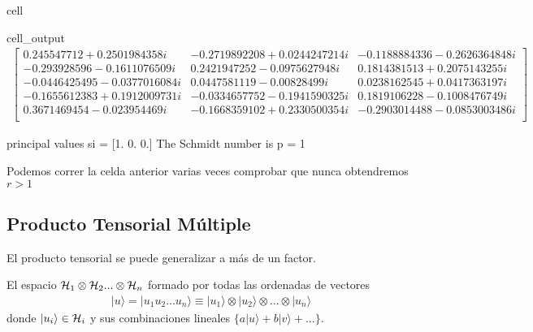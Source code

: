 \documentclass[letterpaper,10pt,english]{jupyterBook}
\newcommand{\ket}[1]{|#1\rangle}
\newcommand{\Hil}{{\cal H}}
\begin{document}
\begin{sphinxuseclass}{cell}
\begin{sphinxVerbatimOutput}
\begin{sphinxuseclass}{cell_output}\begin{equation*}
\begin{split}\begin{bmatrix}
0.245547712 + 0.2501984358 i & -0.2719892208 + 0.0244247214 i & -0.1188884336 - 0.2626364848 i  \\
 -0.293928596 - 0.1611076509 i & 0.2421947252 - 0.0975627948 i & 0.1814381513 + 0.2075143255 i  \\
 -0.0446425495 - 0.0377016084 i & 0.0447581119 - 0.00828499 i & 0.0238162545 + 0.0417363197 i  \\
 -0.1655612383 + 0.1912009731 i & -0.0334657752 - 0.1941590325 i & 0.1819106228 - 0.1008476749 i  \\
 0.3671469454 - 0.023954469 i & -0.1668359102 + 0.2330500354 i & -0.2903014488 - 0.0853003486 i  \\
 \end{bmatrix}
\end{split}
\end{equation*}
\begin{sphinxVerbatim}[commandchars=\\\{\}]
principal values s\PYGZus{}i =  [1. 0. 0.]
The Schmidt number is p = 1
\end{sphinxVerbatim}

\end{sphinxuseclass}\end{sphinxVerbatimOutput}

\end{sphinxuseclass}
\sphinxAtStartPar
Podemos correr la celda anterior varias veces comprobar que nunca obtendremos \(r>1\)


\subsection{Producto Tensorial Múltiple}
\label{\detokenize{docs/Part_01_Formalismo/Chapter_01_02_Formalismo_matem_xe1tico/01_04_Tensores_myst:producto-tensorial-multiple}}
\sphinxAtStartPar
El producto tensorial se puede generalizar a más de un factor.

\sphinxAtStartPar
El espacio \( \Hil_1\otimes \Hil_2 ... \otimes \Hil_n\) formado por todas las  ordenadas de vectores
\begin{equation*}
\begin{split}\ket{u} = \ket{u_1u_2...u_n} \equiv\ket{u_1}\otimes\ket{u_2}\otimes ...\otimes \ket{u_n}\end{split}
\end{equation*}
\sphinxAtStartPar
donde \(\ket{u_i}\in 
\Hil_i\) y sus combinaciones lineales \(\{ a\ket{u}+ b\ket{v} + ...\}\).
\end{document}
